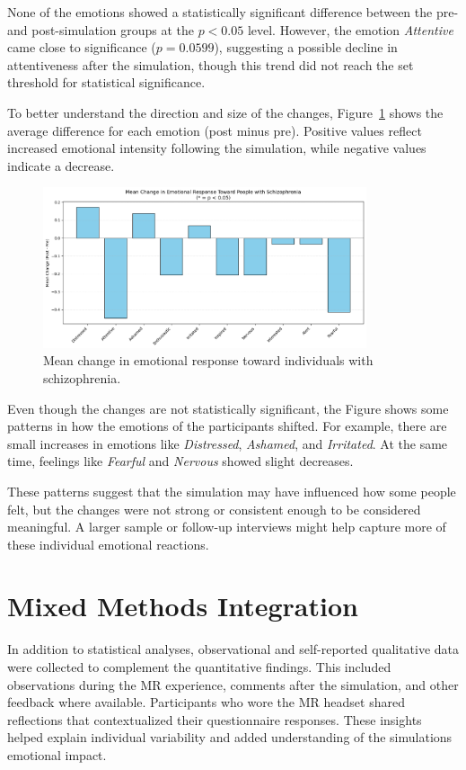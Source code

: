 None of the emotions showed a statistically significant difference between the pre- and post-simulation groups at the $p < 0.05$ level. However, the emotion \textit{Attentive} came close to significance ($p = 0.0599$), suggesting a possible decline in attentiveness after the simulation, though this trend did not reach the set threshold for statistical significance.

\vspace{1em}

To better understand the direction and size of the changes, Figure~\ref{fig:emotion_change} shows the average difference for each emotion (post minus pre). Positive values reflect increased emotional intensity following the simulation, while negative values indicate a decrease.


\begin{figure}[H]
    \centering
    \includegraphics[width=0.85\textwidth]{../../Figures/mean-change-emotions.png}
    \caption{Mean change in emotional response toward individuals with schizophrenia.}
    \label{fig:emotion_change}
\end{figure}

Even though the changes are not statistically significant, the Figure shows some patterns in how the emotions of the participants shifted. For example, there are small increases in emotions like \textit{Distressed}, \textit{Ashamed}, and \textit{Irritated}. At the same time, feelings like \textit{Fearful} and \textit{Nervous} showed slight decreases.

\vspace{1em}

These patterns suggest that the simulation may have influenced how some people felt, but the changes were not strong or consistent enough to be considered meaningful. A larger sample or follow-up interviews might help capture more of these individual emotional reactions.

\section{Mixed Methods Integration}
In addition to statistical analyses, observational and self-reported qualitative data were collected to complement the quantitative findings. This included observations during the MR experience, comments after the simulation, and other feedback where available. Participants who wore the MR headset shared reflections that contextualized their questionnaire responses. These insights helped explain individual variability and added understanding of the simulations emotional impact.


